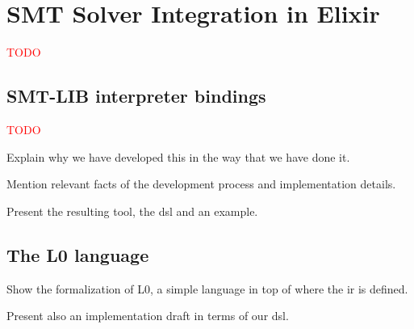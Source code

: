 \chapter{SMT Solver Integration in Elixir}
\label{cap:smtSolverIntegration}

\textcolor{red}{TODO}

\section{SMT-LIB interpreter bindings}

\textcolor{red}{TODO}

Explain why we have developed this in the way that we have done it.

Mention relevant facts of the development process and implementation details.

Present the resulting tool, the \gls{dsl} and an example.

\section{The L0 language}

Show the formalization of L0, a simple language in top of where 
the \gls{ir} is defined.

Present also an implementation draft in terms of our \gls{dsl}.
